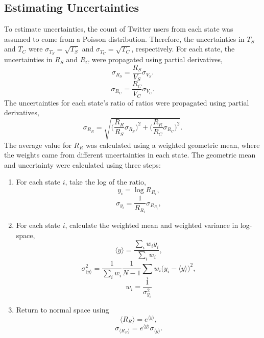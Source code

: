 \documentclass[12pt]{extarticle}
\begin{document}
\subsection{Estimating Uncertainties}
To estimate uncertainties, the count of Twitter users from each state was assumed to come from a Poisson distribution.
Therefore, the uncertainties in $T_S$ and $T_C$ were $\sigma_{T_S} = \sqrt{T_S}$ and $\sigma_{T_C} = \sqrt{T_C}$, respectively.
For each state, the uncertainties in $R_S$ and $R_C$ were propagated using partial derivatives,
\begin{equation}
	\sigma_{R_S} = \frac{R_S}{V_S} \sigma_{V_S}.
\end{equation}
\begin{equation}
	\sigma_{R_C} = \frac{R_C}{V_C} \sigma_{V_C}.
\end{equation}
The uncertainties for each state's ratio of ratios were propagated using partial derivatives,
\begin{equation}
	\sigma_{R_R} = \sqrt{\Big(\frac{R_R}{R_S} \sigma_{R_S}\Big)^2 + \Big(\frac{R_R}{R_C} \sigma_{R_C}\Big)^2}.
\end{equation}
The average value for $R_R$ was calculated using a weighted geometric mean, where the weights came from different uncertainties in each state.
The geometric mean and uncertainty were calculated using three steps:
\begin{enumerate}
	\item For each state $i$, take the log of the ratio,
		\begin{equation}
		y_i = \log{R_{R_i}},
	\end{equation}
	\begin{equation}
		\sigma_{y_i} = \frac{1}{R_{R_i}} \sigma_{R_{R_i}},
	\end{equation}

	\item For each state $i$, calculate the weighted mean and weighted variance in log-space,
		\begin{equation}
			\langle y \rangle = \frac{\sum_i w_i y_i}{\sum_i w_i},
		\end{equation}
		\begin{equation}
			\sigma_{\langle y \rangle}^2 = \frac{1}{\sum_i w_i} \frac{1}{N-1} \sum_i w_i \Big(y_i - \langle y \rangle \Big)^2,
		\end{equation}
		\begin{equation}
			w_i = \frac{1}{\sigma_{y_i}^2}
		\end{equation}
	\item Return to normal space using
		\begin{equation}
			\langle R_R \rangle = e^{\langle y \rangle},
		\end{equation}
		\begin{equation}
			\sigma_{\langle R_R \rangle} = e^{\langle y \rangle} \sigma_{\langle y \rangle}.
		\end{equation}
\end{enumerate}
\end{document}

